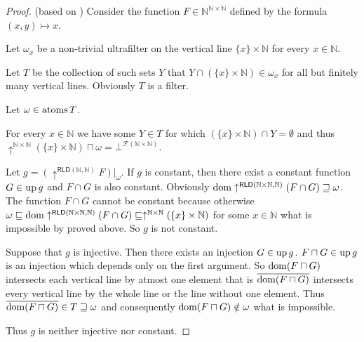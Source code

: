 \begin{proof}
(based on \cite{MO44055}) Consider the function $F\in\mathbb{N}^{\mathbb{N}\times\mathbb{N}}$
defined by the formula $(x,y)\mapsto x$.

Let $\omega_{x}$ be a non-trivial ultrafilter on the vertical line
$\{x\}\times\mathbb{N}$ for every $x\in\mathbb{N}$.

Let $T$ be the collection of such sets $Y$ that $Y\cap(\{x\}\times\mathbb{N})\in\omega_{x}$
for all but finitely many vertical lines. Obviously $T$ is a filter.

Let $\omega\in\operatorname{atoms} T$.

For every $x\in\mathbb{N}$ we have some $Y\in T$ for which $(\{x\}\times\mathbb{N})\cap Y=\emptyset$
and thus $\uparrow^{\mathbb{N}\times\mathbb{N}}(\{x\}\times\mathbb{N})\sqcap\omega=\bot^{\mathscr{F}(\mathbb{N}\times\mathbb{N})}$.

Let $g=(\uparrow^{\mathsf{RLD}(\mathbb{N},\mathbb{N})}F)|_{\omega}$.
If $g$ is constant, then there exist a constant function $G\in\operatorname{up} g$
and $F\cap G$ is also constant. Obviously $\operatorname{dom}\uparrow^{\mathsf{RLD}(\mathbb{N}\times\mathbb{N},\mathbb{N})}(F\cap G)\sqsupseteq\omega$.
The function $F\cap G$ cannot be constant because otherwise $\omega\sqsubseteq\operatorname{dom}\uparrow^{\mathsf{RLD}(\mathbb{N}\times\mathbb{N},\mathbb{N})}(F\cap G)\sqsubseteq\uparrow^{\mathbb{N}\times\mathbb{N}}(\{x\}\times\mathbb{N})$
for some $x\in\mathbb{N}$ what is impossible by proved above. So
$g$ is not constant.

Suppose that $g$ is injective. Then there exists an injection $G\in\operatorname{up} g$.
$F\sqcap G\in\operatorname{up} g$ is an injection which depends only on the first argument.
So $\operatorname{dom}(F\sqcap G)$ intersects each vertical line by atmost one element that
is $\overline{\operatorname{dom}(F\sqcap G)}$ intersects every vertical line by the whole
line or the line without one element. Thus $\overline{\operatorname{dom}(F\sqcap G)}\in T\sqsupseteq\omega$
and consequently $\operatorname{dom}(F\sqcap G)\notin\omega$ what is impossible.

Thus $g$ is neither injective nor constant.
\end{proof}

